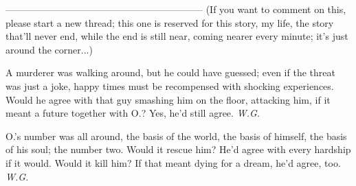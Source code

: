 --------------------------------------------------------------
(If you want to comment on this, please start a new thread; this one is reserved for this story, my life, the story that'll never end, while the end is still near, coming nearer every minute; it's just around the corner...)

A murderer was walking around, 
but he could have guessed; 
even if the threat was just a joke, 
happy times must be recompensed 
with shocking experiences. 
Would he agree with that guy 
smashing him on the floor, 
attacking him, 
if it meant a future together with O.? 
Yes, he'd still agree. 
\emph{W.G.}

O.'s number was all around, 
the basis of the world, 
the basis of himself, 
the basis of his soul; 
the number two. 
Would it rescue him? 
He'd agree with every hardship if it would. 
Would it kill him? 
If that meant dying for a dream, 
he'd agree, too. 
\emph{W.G.}

